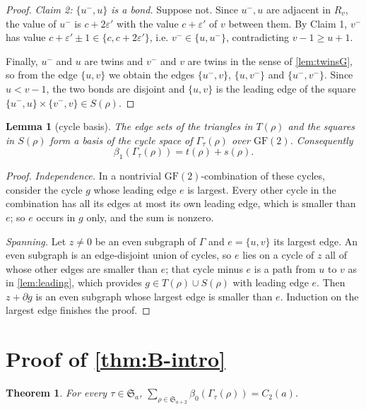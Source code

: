 \documentclass[11pt,reqno]{amsart}
\theoremstyle{plain}
\newtheorem{theorem}{Theorem}[section]
\newtheorem{lemma}[lemma]{Lemma}
\theoremstyle{definition}
\theoremstyle{remark}
\newcommand{\Sym}{\mathfrak{S}}
\newcommand{\Gam}{\Gamma}
\newcommand{\bz}{\beta_0}
\newcommand{\bone}{\beta_1}
\begin{document}
\begin{proof}
\emph{Claim 2: $\{u^-,u\}$ is a bond.} Suppose not. Since $u^-,u$ are adjacent in $R_v$, the value of $u^-$ is $c+2\varepsilon'$ with the value $c+\varepsilon'$ of $v$ between them. By Claim 1, $v^-$ has value $c+\varepsilon'\pm1\in\{c,c+2\varepsilon'\}$, i.e. $v^-\in\{u,u^-\}$, contradicting $v-1\ge u+1$.

Finally, $u^-$ and $u$ are twins and $v^-$ and $v$ are twins in the sense of \cref{lem:twinsG}, so from the edge $\{u,v\}$ we obtain the edges $\{u^-,v\}$, $\{u,v^-\}$ and $\{u^-,v^-\}$. Since $u<v-1$, the two bonds are disjoint and $\{u,v\}$ is the leading edge of the square $\{u^-,u\}\times\{v^-,v\}\in S(\rho)$.
\end{proof}

\begin{lemma}[cycle basis]\label{lem:basis}
The edge sets of the triangles in $T(\rho)$ and the squares in $S(\rho)$ form a basis of the cycle space of $\Gam_\tau(\rho)$ over $\mathrm{GF}(2)$. Consequently
\begin{equation}\label{eq:b1}
\bone(\Gam_\tau(\rho))=t(\rho)+s(\rho).
\end{equation}
\end{lemma}

\begin{proof}
\emph{Independence.} In a nontrivial $\mathrm{GF}(2)$-combination of these cycles, consider the cycle $g$ whose leading edge $e$ is largest. Every other cycle in the combination has all its edges at most its own leading edge, which is smaller than $e$; so $e$ occurs in $g$ only, and the sum is nonzero.

\emph{Spanning.} Let $z\ne0$ be an even subgraph of $\Gam$ and $e=\{u,v\}$ its largest edge. An even subgraph is an edge-disjoint union of cycles, so $e$ lies on a cycle of $z$ all of whose other edges are smaller than $e$; that cycle minus $e$ is a path from $u$ to $v$ as in \cref{lem:leading}, which provides $g\in T(\rho)\cup S(\rho)$ with leading edge $e$. Then $z+\partial g$ is an even subgraph whose largest edge is smaller than $e$. Induction on the largest edge finishes the proof.
\end{proof}

\section{Proof of \texorpdfstring{\cref{thm:B-intro}}{Theorem 1.2}}\label{sec:thmA}

\begin{theorem}\label{thm:A}
For every $\tau\in\Sym_a$, $\sum_{\rho\in\Sym_{a+2}}\bz(\Gam_\tau(\rho))=C_2(a)$.
\end{theorem}
\end{document}
